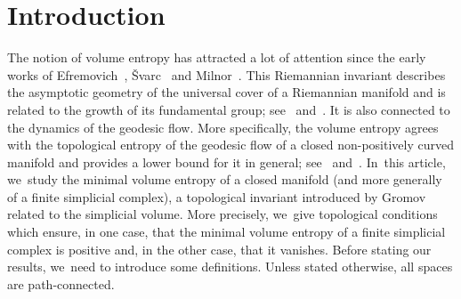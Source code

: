 \documentclass[11pt]{article}
\theoremstyle{definition}
\numberwithin{equation}{section}
\begin{document}
\section{Introduction}

The notion of volume entropy has attracted a lot of attention since the early works of Efremovich~\cite{Efrem53}, \v{S}varc~\cite{Shvarts55} and Milnor~\cite{Milnor68}.
This Riemannian invariant describes the asymptotic geometry of the universal cover of a Riemannian manifold and is related to the growth of its fundamental group; see~\cite{Shvarts55} and~\cite{Milnor68}.
It is also connected to the dynamics of the geodesic flow.
More specifically, the volume entropy agrees with the topological entropy of the geodesic flow of a closed non-positively curved manifold and provides a lower bound for it in general; see~\cite{Dinaburg71} and~\cite{Manning79}. In~this article, we~study the minimal volume entropy of a closed manifold (and more generally of a finite simplicial complex), a topological invariant introduced by Gromov~\cite{gro82} related to the simplicial volume.
More precisely, we~give topological conditions which ensure, in one case, that the minimal volume entropy of a finite simplicial complex is positive and, in the other case, that it vanishes.
Before stating our results, we~need to introduce some definitions.
Unless stated otherwise, all spaces are path-connected.
\end{document}
